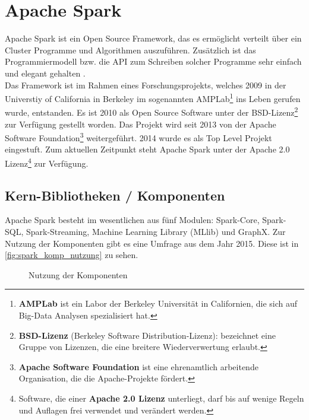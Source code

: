 \newpage
\chapter{Apache Spark} 

Apache Spark ist ein Open Source Framework, das es ermöglicht verteilt über ein Cluster Programme und Algorithmen auszuführen. Zusätzlich ist das Programmiermodell bzw. die API zum Schreiben solcher Programme sehr einfach und elegant gehalten \cite{AAWS15}. \\

\noindent
Das Framework ist im Rahmen eines Forschungsprojekts, welches 2009 in der Universtiy of California in Berkeley im sogenannten AMPLab\footnote{\textbf{AMPLab} ist ein Labor der Berkeley Universität in Californien, die sich auf Big-Data Analysen spezialisiert hat. } ins Leben gerufen wurde, entstanden. Es ist 2010 als Open Source Software unter der BSD-Lizenz\footnote{\textbf{BSD-Lizenz} (Berkeley Software Distribution-Lizenz): bezeichnet eine Gruppe von Lizenzen, die eine breitere Wiederverwertung erlaubt.} zur Verfügung gestellt worden. Das Projekt wird seit 2013 von der Apache Software Foundation\footnote{\textbf{Apache Software Foundation} ist eine ehrenamtlich arbeitende Organisation, die die Apache-Projekte fördert.} weitergeführt. 2014 wurde es als Top Level Projekt eingestuft. Zum aktuellen Zeitpunkt steht Apache Spark unter der Apache 2.0 Lizenz\footnote{Software, die einer \textbf{Apache 2.0 Lizenz} unterliegt, darf bis auf wenige Regeln und Auflagen frei verwendet und verändert werden.} zur Verfügung. \\



\section{Kern-Bibliotheken / Komponenten}

Apache Spark besteht im wesentlichen aus fünf Modulen: Spark-Core, Spark-SQL, Spark-Streaming, Machine Learning Library (MLlib) und GraphX. Zur Nutzung der Komponenten gibt es eine Umfrage aus dem Jahr 2015. Diese ist in \autoref{fig:spark_komp_nutzung} zu sehen. \\

\begin{figure}[h]
  \centering
  \caption{Nutzung der Komponenten \cite{ZXW+16}}\label{fig:spark_komp_nutzung}
\end{figure}


